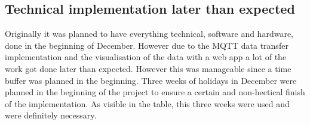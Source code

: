 \subsection{Technical implementation later than expected}

Originally it was planned to have everything technical, software and hardware, done in the beginning of December. However due to the MQTT data transfer implementation and the visualisation of the data with a web app a lot of the work got done later than expected. However this was manageable since a time buffer was planned in the beginning. Three weeks of holidays in December were planned in the beginning of the project to ensure a certain and non-hectical finish of the implementation. As visible in the table, this three weeks were used and were definitely necessary. 
